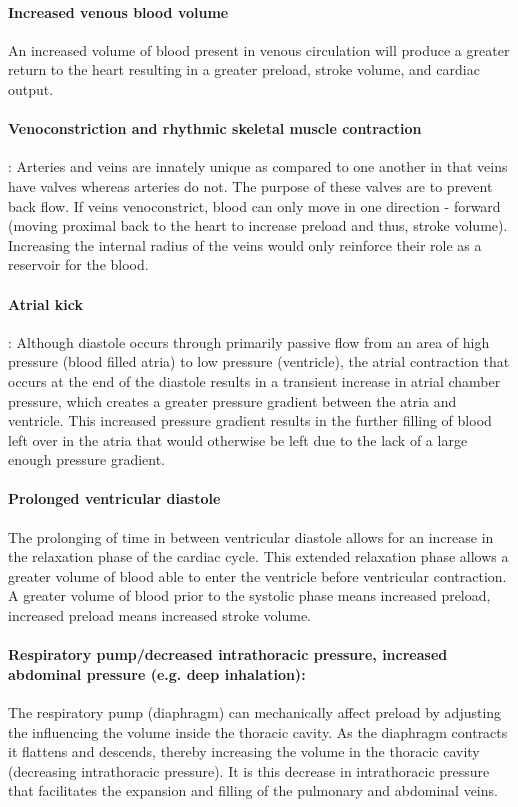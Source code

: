 \paragraph{Increased venous blood volume}
An increased volume of blood present in venous circulation will produce a greater return to the heart resulting in a greater preload, stroke volume, and cardiac output. 

\paragraph{Venoconstriction and rhythmic skeletal muscle contraction}: 
Arteries and veins are innately unique as compared to one another in that veins have valves whereas arteries do not. The purpose of these valves are to prevent back flow. If veins venoconstrict, blood can only move in one direction - forward (moving proximal back to the heart to increase preload and thus, stroke volume). Increasing the internal radius of the veins would only reinforce their role as a reservoir for the blood. 

\paragraph{Atrial kick}: 
Although diastole occurs through primarily passive flow from an area of high pressure (blood filled atria) to low pressure (ventricle), the atrial contraction that occurs at the end of the diastole results in a transient increase in atrial chamber pressure, which creates a greater pressure gradient between the atria and ventricle. This increased pressure gradient results in the further filling of blood left over in the atria that would otherwise be left due to the lack of a large enough pressure gradient.  

\paragraph{Prolonged ventricular diastole}
The prolonging of time in between ventricular diastole allows for an increase in the relaxation phase of the cardiac cycle. This extended relaxation phase allows a greater volume of blood able to enter the ventricle before ventricular contraction. A greater volume of blood prior to the systolic phase means increased preload, increased preload means increased stroke volume.  

\paragraph{Respiratory pump/decreased intrathoracic pressure, increased abdominal pressure (e.g. deep inhalation):} The respiratory pump (diaphragm) can mechanically affect preload by adjusting the influencing the volume inside the thoracic cavity. As the diaphragm contracts it flattens and descends, thereby increasing the volume in the thoracic cavity (decreasing intrathoracic pressure). It is this decrease in intrathoracic pressure that facilitates the expansion and filling of the pulmonary and abdominal veins. 

